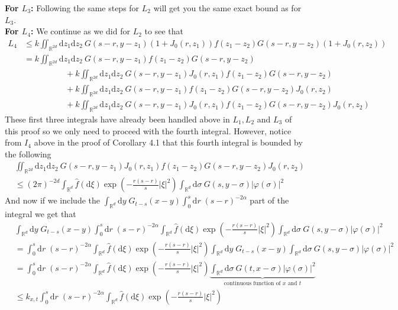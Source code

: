 \documentclass{article}
\numberwithin{equation}{section}
\newcommand{\R}{\mathbb{R}}
\newcommand{\ud}{\ensuremath{\mathrm{d}}}
\begin{document}
\noindent \textbf{For $L_3$:} Following the same steps for $L_2$ will get you the same exact bound as for $L_3$. \\ 

\noindent \textbf{For $L_4$:} We continue as we did for $L_2$ to see that 
\begin{align*}
L_4 &\le k\iint_{\R^{2d}}\ud z_1 \ud z_2\:G(s-r,y-z_1)(1+J_0(r,z_1))f(z_1-z_2)G(s-r,y-z_2)(1+J_0(r,z_2))
\\&= k\iint_{\R^{2d}}\ud z_1 \ud z_2\:G(s-r,y-z_1)f(z_1-z_2)G(s-r,y-z_2)
\\&\hspace{5em}+k\iint_{\R^{2d}}\ud z_1 \ud z_2\:G(s-r,y-z_1)J_0(r,z_1)f(z_1-z_2)G(s-r,y-z_2)
\\&\hspace{5em}+ k\iint_{\R^{2d}}\ud z_1 \ud z_2\:G(s-r,y-z_1)f(z_1-z_2)G(s-r,y-z_2)J_0(r,z_2)
\\&\hspace{5em}+k\iint_{\R^{2d}}\ud z_1 \ud z_2\:G(s-r,y-z_1)J_0(r,z_1)f(z_1-z_2)G(s-r,y-z_2)J_0(r,z_2)
\end{align*}
These first three integrals have already been handled above in $L_1, L_2$ and $L_3$ of this proof so we only need to proceed with the fourth integral. However, notice from $I_4$ above in the proof of Corollary 4.1 that this fourth integral is bounded by the following
\begin{align*}
&\iint_{\R^{2d}}\ud z_1 \ud z_2\:G(s-r,y-z_1)J_0(r,z_1)f(z_1-z_2)G(s-r,y-z_2)J_0(r,z_2)
\\ &\le (2\pi)^{-2d}\int_{\R^d} \hat{f}(\ud \xi)\exp\left(-\frac{r(s-r)}{s}|\xi|^2\right) \int_{\R^{d}}\ud \sigma\:G(s,y-\sigma)|\varphi(\sigma)|^2
\end{align*} 
And now if we include the $\int_{\R^d}\ud y \;G_{t-s}(x-y)\int_0^s\ud r\; (s-r)^{-2\alpha}$ part of the integral we get that
\begin{align*}
&\int_{\R^d}\ud y \;G_{t-s}(x-y)\int_0^s\ud r\; (s-r)^{-2\alpha}\int_{\R^d} \hat{f}(\ud \xi)\exp\left(-\frac{r(s-r)}{s}|\xi|^2\right) \int_{\R^{d}}\ud \sigma\:G(s,y-\sigma)|\varphi(\sigma)|^2
\\&= \int_0^s\ud r\; (s-r)^{-2\alpha}\int_{\R^d} \hat{f}(\ud \xi)\exp\left(-\frac{r(s-r)}{s}|\xi|^2\right)\int_{\R^d}\ud y \;G_{t-s}(x-y) \int_{\R^{d}}\ud \sigma\:G(s,y-\sigma)|\varphi(\sigma)|^2
\\&= \int_0^s\ud r\; (s-r)^{-2\alpha}\int_{\R^d} \hat{f}(\ud \xi)\exp\left(-\frac{r(s-r)}{s}|\xi|^2\right)\underbrace{\int_{\R^{d}}\ud \sigma\:G(t,x-\sigma)|\varphi(\sigma)|^2}_{\text{continuous function of $x$ and $t$}}
\\&\le k_{x,t}\int_0^s\ud r\; (s-r)^{-2\alpha}\int_{\R^d} \hat{f}(\ud \xi)\exp\left(-\frac{r(s-r)}{s}|\xi|^2\right)
\end{align*}
\end{document}
